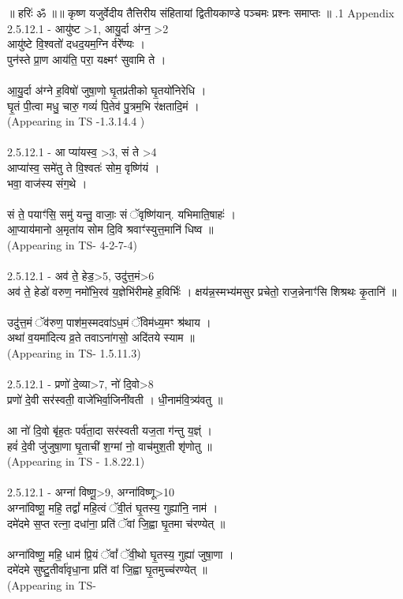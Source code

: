 \documentclass[17pt]{extarticle}
\begin{document}
        
        ॥ हरिः॑ ॐ ॥॥ कृष्ण यजुर्वेदीय तैत्तिरीय संहितायां द्वितीयकाण्डे पञ्चमः प्रश्नः समाप्तः ॥ \newline
        .1   Appendix\\2.5.12.1 - आयु॑ष्ट >1, आयु॒र्दा अ॑ग्न॒ >2\\आयु॑ष्टे वि॒श्वतो॑ दधद॒यम॒ग्नि र्वरे᳚ण्यः । \\पुन॑स्ते प्रा॒ण आय॑ति॒ परा॒ यक्ष्मꣳ॑ सुवामि ते । \\\\आ॒यु॒र्दा अ॑ग्ने ह॒विषो॑ जुषा॒णो घृ॒तप्र॑तीको घृ॒तयो॑निरेधि । \\घृ॒तं पी॒त्वा मधु॒ चारु॒ गव्यं॑ पि॒तेव॑ पु॒त्रम॒भि र॑क्षतादि॒मं । \\(Appearing in TS -1.3.14.4 )\\\\2.5.12.1 - आ प्या॑यस्व॒ >3, सं ते >4\\आप्या॑स्व॒ समे॑तु ते वि॒श्वतः॑ सोम॒ वृष्णि॑यं ।\\भवा॒ वाज॑स्य संग॒थे । \\\\सं ते॒ पयाꣳ॑सि॒ समु॑ यन्तु॒ वाजाः॒ सं ॅवृष्णि॑यान्. यभिमाति॒षाहः॑ ।\\आ॒प्याय॑मानो अ॒मृता॑य सोम दि॒वि श्रवाꣳ॑स्युत्त॒मानि॑ धिष्व ॥ \\(Appearing in TS- 4-2-7-4)\\\\2.5.12.1 - अव॑ ते॒ हेड॒>5, उदु॑त्त॒मं>6\\अव॑ ते॒ हेडो॑ वरुण॒ नमो॑भि॒रव॑ य॒ज्ञेभि॑रीमहे ह॒विर्भिः॑ । क्षय॑न्न॒स्मभ्य॑मसुर प्रचेतो॒ राज॒न्नेनाꣳ॑सि शिश्रथः कृ॒तानि॑ ॥ \\\\उदु॑त्त॒मं ॅव॑रुण॒ पाश॑म॒स्मदवा॑ऽध॒मं ॅविम॑ध्य॒मꣳ श्र॑थाय । \\अथा॑ व॒यमा॑दित्य व्र॒ते तवाऽना॑गसो॒ अदि॑तये स्याम ॥\\(Appearing in TS- 1.5.11.3)\\\\2.5.12.1 - प्रणो॑ दे॒व्या>7, नो॑ दि॒वो>8\\प्रणो॑ दे॒वी सर॑स्वती॒ वाजे॑भिर्वा॒जिनी॑वती । धी॒नाम॑वि॒त्र्य॑वतु ॥\\\\आ नो॑ दि॒वो बृ॑ह॒तः पर्व॑ता॒दा सर॑स्वती यज॒ता ग॑न्तु य॒ज्ञ्ं । \\हवं॑ दे॒वी जु॑जुषा॒णा घृ॒ताची॑ श॒ग्मां नो॒ वाच॑मुश॒ती शृ॑णोतु ॥\\(Appearing in TS - 1.8.22.1)\\\\2.5.12.1 - अग्ना॑ विष्णू॒>9, अग्ना॑विष्णू>10\\अग्ना॑विष्णू॒ महि॒ तद्वां᳚ महि॒त्वं ॅवी॒तं घृ॒तस्य॒ गुह्या॑नि॒ नाम॑ । \\दमे॑दमे स॒प्त रत्ना॒ दधा॑ना॒ प्रति॑ ॅवां जि॒ह्वा घृ॒तमा च॑रण्येत् ॥\\\\अग्ना॑विष्णू॒ महि॒ धाम॑ प्रि॒यं ॅवां᳚ ॅवी॒थो घृ॒तस्य॒ गुह्या॑ जुषा॒णा । \\दमे॑दमे सुष्टु॒तीर्वा॑वृधा॒ना प्रति॑ वां जि॒ह्वा घृ॒तमुच्च॑रण्येत् ॥\\(Appearing in TS- 
\end{document}
